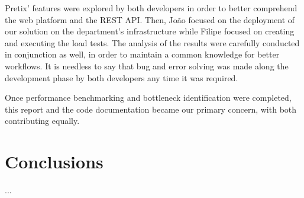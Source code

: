 \documentclass[12pt]{article}
\begin{document}
Pretix' features were explored by both developers in order to better comprehend the web platform and the REST API.
Then, João focused on the deployment of our solution on the department's infrastructure while Filipe focused on creating and executing the load tests.
The analysis of the results were carefully conducted in conjunction as well, in order to maintain a common knowledge for better workflows.
It is needless to say that bug and error solving was made along the development phase by both developers any time it was required.

Once performance benchmarking and bottleneck identification were completed, this report and the code documentation became our primary concern, with both 
contributing equally.

\newpage
\section*{Conclusions} \label{conclusions} %

...
\end{document}
